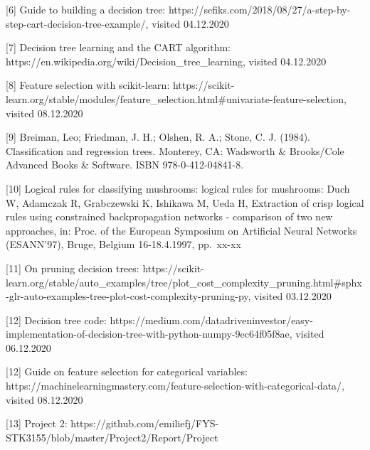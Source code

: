 \documentclass[11pt]{article}
\begin{document}
{[}6{]} Guide to building a decision tree:
https://sefiks.com/2018/08/27/a-step-by-step-cart-decision-tree-example/,
visited 04.12.2020

{[}7{]} Decision tree learning and the CART algorithm:
https://en.wikipedia.org/wiki/Decision\_tree\_learning, visited
04.12.2020

{[}8{]} Feature selection with scikit-learn:
https://scikit-learn.org/stable/modules/feature\_selection.html\#univariate-feature-selection,
visited 08.12.2020

{[}9{]} Breiman, Leo; Friedman, J. H.; Olshen, R. A.; Stone, C. J.
(1984). Classification and regression trees. Monterey, CA: Wadsworth \&
Brooks/Cole Advanced Books \& Software. ISBN 978-0-412-04841-8.

{[}10{]} Logical rules for classifying mushrooms: logical rules for
mushrooms: Duch W, Adamczak R, Grabczewski K, Ishikawa M, Ueda H,
Extraction of crisp logical rules using constrained backpropagation
networks - comparison of two new approaches, in: Proc. of the European
Symposium on Artificial Neural Networks (ESANN'97), Bruge, Belgium
16-18.4.1997, pp.~xx-xx

{[}11{]} On pruning decision trees:
https://scikit-learn.org/stable/auto\_examples/tree/plot\_cost\_complexity\_pruning.html\#sphx-glr-auto-examples-tree-plot-cost-complexity-pruning-py,
visited 03.12.2020

{[}12{]} Decision tree code:
https://medium.com/datadriveninvestor/easy-implementation-of-decision-tree-with-python-numpy-9ec64f05f8ae,
visited 06.12.2020

{[}12{]} Guide on feature selection for categorical variables:
https://machinelearningmastery.com/feature-selection-with-categorical-data/,
visited 08.12.2020

[13] Project 2: https://github.com/emiliefj/FYS-STK3155/blob/master/Project2/Report/Project%


    
    
    
\end{document}

